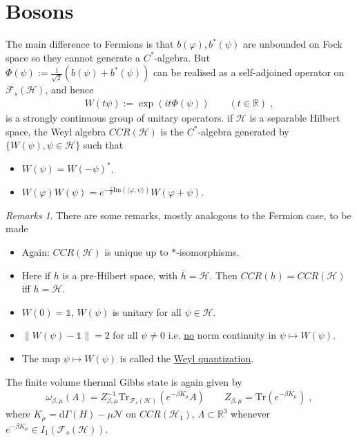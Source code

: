\documentclass[
a4paper, %
11pt, %
onecolumn, %
openany, %
]{memoir}
\theoremstyle{definition}
\theoremstyle{remark}
\newtheorem{remarks}{Remarks}[chapter]
\theoremstyle{plain}
\begin{document}
\section{Bosons}
The main difference to Fermions is that $b(\varphi),b^*(\psi)$ are unbounded on Fock space so they cannot generate a $C^*$-algebra. But $\Phi(\psi):=\frac{1}{\sqrt{2}}(b(\psi)+b^*(\psi))$ can be realised as a self-adjoined operator on $\mathcal{F}_s(\mathcal{H})$, and hence \begin{align}
W(t\psi):=\exp(it\Phi(\psi))\qquad (t\in\mathbb{R})\; ,
\end{align}
is a strongly continuous group of unitary operators. if $\mathcal{H}$ is a separable Hilbert space, the Weyl algebra $CCR(\mathcal{H})$ is the $C^*$-algebra generated by $\{W(\psi),\psi\in\mathcal{H}\}$ such that \begin{itemize}
	\item $W(\psi)=W(-\psi)^*$.
	\item $W(\varphi)W(\psi)=e^{-\frac{i}{2}\mathrm{Im}(\langle\varphi,\psi\rangle)}W(\varphi+\psi)$.
\end{itemize}
\begin{remarks}
	There are some remarks, mostly analogous to the Fermion case, to be made \begin{itemize}
		\item Again: $CCR(\mathcal{H})$ is unique up to $*$-isomorphisms.
		\item Here if $h$ is a pre-Hilbert space, with $\overline{h}=\mathcal{H}$. Then $CCR(h)=CCR(\mathcal{H})$ iff $h=\mathcal{H}$.
		\item $W(0)=\mathds{1}$, $W(\psi)$ is unitary for all $\psi\in\mathcal{H}$.
		\item $\|W(\psi)-\mathds{1}\|=2$ for all $\psi\neq 0$ i.e. \underline{no} norm continuity in $\psi\mapsto W(\psi)$.
		\item The map $\psi\mapsto W(\psi)$ is called the \underline{Weyl quantization}.
	\end{itemize}
\end{remarks}
The finite volume thermal Gibbs state is again given by \begin{align}
\omega_{\beta,\mu}(A)=Z^{-1}_{\beta,\mu}\mathrm{Tr}_{\mathcal{F}_s(\mathcal{H})}(e^{-\beta K_{\mu}}A)\qquad Z_{\beta,\mu}=\mathrm{Tr}(e^{-\beta K_{\mu}}) \label{eqn::symm_gibbs}\; ,
\end{align}
where $K_{\mu}=\mathrm{d}\Gamma(H)-\mu\mathcal{N}$ on $CCR(\mathcal{H}_1)$, $\Lambda\subset\mathbb{R}^3$ whenever $e^{-\beta K_{\mu}}\in I_1(\mathcal{F}_s(\mathcal{H}))$.
\end{document}
